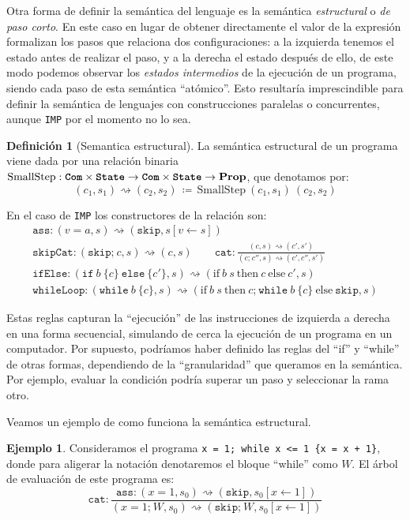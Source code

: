\documentclass[
  a4paper, 
  10pt, 
  parskip=half, 
  toc=bibliography,
]{scrbook}
\theoremstyle{definition}
\theoremstyle{bolddef}
\newtheorem{definition}[theorem]{Definición}
\newtheorem{example}[theorem]{Ejemplo}
\newcommand{\funfont}[1]{\texttt{#1}}
\newcommand{\tyfont}[1]{\texttt{\textbf{#1}}}
\newcommand{\Prop}{\mathbf{Prop}}
\newcommand{\ImpIfElse}[3]{\texttt{if} \ {#1} \ \{{#2}\} \ \texttt{else} \ \{{#3}\}}
\newcommand{\ImpWhile}[2]{\texttt{while} \ {#1} \ \{{#2}\}}
\newcommand{\ImpConcat}[2]{{#1} \texttt{;} \ {#2}}
\newcommand{\ImpSkip}{\texttt{skip}}
\newcommand{\ImpAssign}[2]{{#1} = {#2}}
\newcommand{\LeanIfElse}[3]{\text{if} \ {#1} \ \text{then} \ {#2} \ \text{else} \ {#3}}
\newcommand{\ImpName}{\texttt{IMP}}
\begin{document}
Otra forma de definir la semántica del lenguaje es la semántica \emph{estructural}
o \emph{de paso corto}. En este caso en lugar de obtener directamente el valor
de la expresión formalizan los pasos que relaciona dos configuraciones:
a la izquierda tenemos el estado antes de realizar el paso, y a la derecha el
estado después de ello, de este modo podemos observar los \emph{estados intermedios} 
de la ejecución de un programa, siendo cada paso de esta semántica 
\enquote{atómico}. Esto resultaría imprescindible para definir la semántica de lenguajes con construcciones 
paralelas o concurrentes, aunque \ImpName{} por el momento no lo sea.
\begin{definition}[Semantica estructural]
  La semántica estructural de un programa viene dada por una relación binaria 
  \(\text{SmallStep} : \tyfont{Com} \times \tyfont{State} \to \tyfont{Com} \times \tyfont{State} \to \Prop\),
  que denotamos por:
  \[
    (c_1, s_1) \rightsquigarrow (c_2, s_2) \, \coloneq \, \text{SmallStep} \ (c_1, s_1) \ (c_2, s_2)
  \]
\end{definition}

En el caso de \ImpName{} los constructores de la relación son:
\[
\begin{gathered}
  \funfont{ass}: (\ImpAssign{v}{a}, s) \rightsquigarrow (\ImpSkip, s[v \leftarrow s]) \\
  \funfont{skipCat}: (\ImpConcat{\ImpSkip}{c}, s) \rightsquigarrow (c, s) \qquad
  \funfont{cat}: \frac{(c, s) \rightsquigarrow (c', s')}{(\ImpConcat{c}{c''}, s) \rightsquigarrow (c', c'', s')} \\
  \funfont{ifElse}: (\ImpIfElse{b}{c}{c'}, s)
    \rightsquigarrow (\LeanIfElse{b \ s}{c}{c'}, s) \\
  \funfont{whileLoop}: (\ImpWhile{b}{c}, s)
    \rightsquigarrow (\LeanIfElse{b \ s}{\ImpConcat{c}{\ImpWhile{b}{c}}}{\ImpSkip}, s) 
\end{gathered}
\]

Estas reglas capturan la \enquote{ejecución} de las instrucciones de izquierda a derecha
en una forma secuencial, simulando de cerca la ejecución de un programa
en un computador. Por supuesto, podríamos haber definido las reglas del 
\enquote{if} y \enquote{while} de otras formas, dependiendo de la \enquote{granularidad}
que queramos en la semántica. Por ejemplo, evaluar la condición podría superar un paso y seleccionar la rama
otro.

Veamos un ejemplo de como funciona la semántica estructural.
\begin{example}\label{ex:small_step}
  Consideramos el programa \texttt{x = 1; while x <= 1 \{x = x + 1\}},
  donde para aligerar la notación denotaremos el bloque \enquote{while} como \(W\).
  El árbol de evaluación de este programa es:
  \[
  \funfont{cat}: \frac{
    \funfont{ass}: (\ImpAssign{x}{1}, s_0) \rightsquigarrow (\ImpSkip, s_0[x \leftarrow 1])
  }
  {(\ImpConcat{\ImpAssign{x}{1}}{W}, s_0)
  \rightsquigarrow
  (\ImpConcat{\ImpSkip}{W}, s_0[x \leftarrow 1])
  }
  \]
\end{example}
\end{document}
